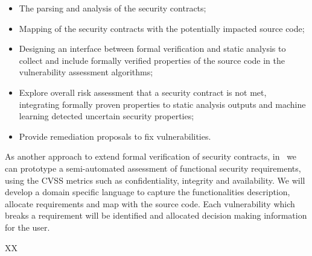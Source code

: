 \begin{Workpackage}{\thewpno}
\begin{Task}
\begin{itemize}
\item The parsing and analysis of the security contracts; %
    \item Mapping of the security contracts with the potentially impacted source code;
    \item Designing an interface between formal verification and static analysis to collect and include formally verified properties of the source code in the vulnerability assessment algorithms;
    \item Explore overall risk assessment that a security contract is not met, integrating formally proven properties to static analysis outputs and machine learning detected uncertain security properties;
    \item Provide remediation proposals to fix vulnerabilities.
\end{itemize}

\end{Task}


\begin{Task}

\TaskResults{%
}
\TaskHeader{}

As another approach to extend formal verification of security contracts, in \theTask\ we can prototype a semi-automated assessment of functional security requirements, using the CVSS metrics such as confidentiality, integrity and availability.
We will develop a domain specific language to capture the functionalities description, allocate requirements and map with the source code. Each vulnerability which breaks a requirement will be identified and allocated decision making information for the user.
\end{Task}


\begin{WPDeliverables}
  \begin{compactitem}
    \item XX
\end{compactitem}
\end{WPDeliverables}
\end{Workpackage}

